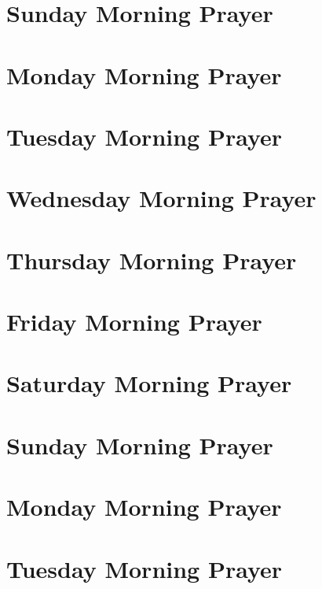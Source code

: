 \documentclass[12pt,twocolumn]{book}
\begin{document}

\section{Sunday Morning Prayer}


\section{Monday Morning Prayer}


\section{Tuesday Morning Prayer}


\section{Wednesday Morning Prayer}


\section{Thursday Morning Prayer}


\section{Friday Morning Prayer}


\section{Saturday Morning Prayer}



\section{Sunday Morning Prayer}


\section{Monday Morning Prayer}


\section{Tuesday Morning Prayer}

\end{document}

